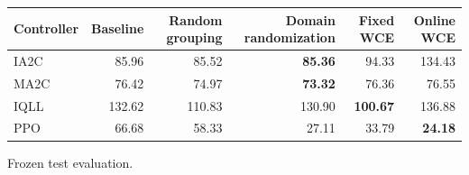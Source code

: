 \begin{tabular}{lrrrrr}
\hline
Controller & Baseline & Random grouping & Domain randomization & Fixed WCE & Online WCE \\
\hline
IA2C & 85.96 & 85.52 & \textbf{85.36} & 94.33 & 134.43 \\
MA2C & 76.42 & 74.97 & \textbf{73.32} & 76.36 & 76.55 \\
IQLL & 132.62 & 110.83 & 130.90 & \textbf{100.67} & 136.88 \\
PPO & 66.68 & 58.33 & 27.11 & 33.79 & \textbf{24.18} \\
\hline
\end{tabular}
Frozen test evaluation.
